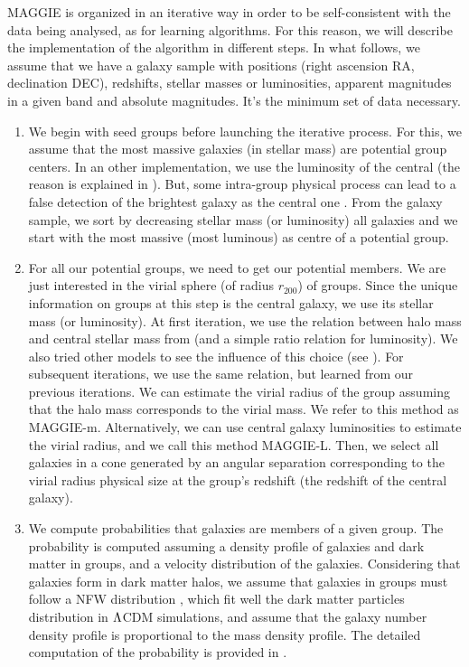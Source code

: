 MAGGIE is organized in an iterative way in order to be self-consistent with the
data being analysed, as for learning algorithms. For this reason, we will
describe the implementation of the algorithm in different steps. In what
follows, we assume that we have a galaxy sample with positions (right ascension
RA, declination DEC), redshifts, stellar masses or luminosities, apparent
magnitudes in a given band and absolute magnitudes. It's the minimum set of
data necessary.
%
\begin{enumerate}
    \item We begin with seed groups before launching the iterative process. For
        this, we assume that the most massive galaxies (in stellar mass) are
        potential group centers. In an other implementation, we use the
        luminosity of the central (the reason is explained in
        ). But, some intra-group
        physical process can lead to a false detection of the brightest galaxy
        as the central one \citep{Ebeling+13}. From the galaxy sample, we sort
        by decreasing stellar mass (or luminosity) all galaxies and we start
        with the most massive (most luminous) as centre of a potential group.

    \item\label{step:2} For all our potential groups, we need to get our
        potential members. We are just interested in the virial sphere (of
        radius $r_{200}$) of groups. Since the unique information on groups at
        this step is the central galaxy, we use its stellar mass (or
        luminosity). At first iteration, we use the relation between halo mass
        and central stellar mass from \citet{BCW+10} (and a simple ratio
        relation for luminosity). We also tried other models to see the
        influence of this choice (see ). For
        subsequent iterations, we use the same relation, but learned from our
        previous iterations. We can estimate the virial radius of the group
        assuming that the halo mass corresponds to the virial mass. We refer to
        this method as MAGGIE-m. Alternatively, we can use central galaxy
        luminosities to estimate the virial radius, and we call this method
        MAGGIE-L. Then, we select all galaxies in a cone generated by an
        angular separation corresponding to the virial radius physical size at
        the group's redshift (the redshift of the central galaxy).

    \item We compute probabilities that galaxies are members of a given group.
        The probability is computed assuming a density profile of galaxies and
        dark matter in groups, and a velocity distribution of the galaxies.
        Considering that galaxies form in dark matter halos, we assume that
        galaxies in groups must follow a NFW distribution \citep{NFW+97}, which
        fit well the dark matter particles distribution in $\rm \Lambda$CDM
        simulations, and assume that the galaxy number density profile is
        proportional to the mass density profile. The detailed computation of
        the probability is provided in .


\end{enumerate}
